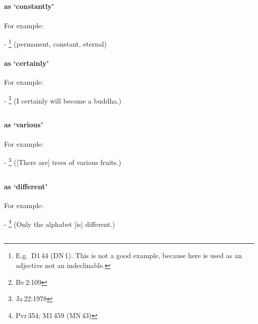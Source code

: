 \subsection*{}\label{nip:dhuvadm}
\paragraph*{ as `constantly'} For example:\par
- \footnote{E.g.\ D1\,44 (DN\,1). This is not a good example, because  here is used as an adjective not an indeclinable.} (permanent, constant, eternal) \par
\paragraph*{ as `certainly'} For example:\par
- \footnote{Bv\,2:109} (I certainly will become a buddha.) \par

\subsection*{}\label{nip:naanaa}
\paragraph*{ as `various'} For example:\par
- \footnote{Ja\,22:1978} ([There are] trees of various fruits.) \par

\subsection*{}\label{nip:naanadm}
\paragraph*{ as `different'} For example:\par
- \footnote{Pvr\,354; M1\,459 (MN\,43)} (Only the alphabet [is] different.) \par

\subsection*{}\label{nip:paatu}

